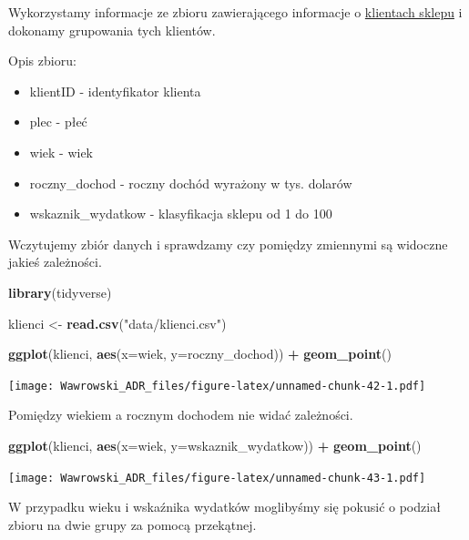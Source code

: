\documentclass[
]{book}
\newenvironment{Shaded}{\begin{snugshade}}{\end{snugshade}}
\newcommand{\DataTypeTok}[1]{\textcolor[rgb]{0.13,0.29,0.53}{#1}}
\newcommand{\KeywordTok}[1]{\textcolor[rgb]{0.13,0.29,0.53}{\textbf{#1}}}
\newcommand{\NormalTok}[1]{#1}
\newcommand{\OperatorTok}[1]{\textcolor[rgb]{0.81,0.36,0.00}{\textbf{#1}}}
\newcommand{\StringTok}[1]{\textcolor[rgb]{0.31,0.60,0.02}{#1}}
\providecommand{\tightlist}{%
  \setlength{\itemsep}{0pt}\setlength{\parskip}{0pt}}
\begin{document}
Wykorzystamy informacje ze zbioru zawierającego informacje o \href{data/klienci.csv}{klientach sklepu} i dokonamy grupowania tych klientów.

Opis zbioru:

\begin{itemize}
\tightlist
\item
  klientID - identyfikator klienta
\item
  plec - płeć
\item
  wiek - wiek
\item
  roczny\_dochod - roczny dochód wyrażony w tys. dolarów
\item
  wskaznik\_wydatkow - klasyfikacja sklepu od 1 do 100
\end{itemize}

Wczytujemy zbiór danych i sprawdzamy czy pomiędzy zmiennymi są widoczne jakieś zależności.

\begin{Shaded}
\begin{Highlighting}[]
\KeywordTok{library}\NormalTok{(tidyverse)}

\NormalTok{klienci <-}\StringTok{ }\KeywordTok{read.csv}\NormalTok{(}\StringTok{"data/klienci.csv"}\NormalTok{)}

\KeywordTok{ggplot}\NormalTok{(klienci, }\KeywordTok{aes}\NormalTok{(}\DataTypeTok{x=}\NormalTok{wiek, }\DataTypeTok{y=}\NormalTok{roczny_dochod)) }\OperatorTok{+}
\StringTok{  }\KeywordTok{geom_point}\NormalTok{()}
\end{Highlighting}
\end{Shaded}

\texttt{[image: Wawrowski\_ADR\_files/figure-latex/unnamed-chunk-42-1.pdf]}

Pomiędzy wiekiem a rocznym dochodem nie widać zależności.

\begin{Shaded}
\begin{Highlighting}[]
\KeywordTok{ggplot}\NormalTok{(klienci, }\KeywordTok{aes}\NormalTok{(}\DataTypeTok{x=}\NormalTok{wiek, }\DataTypeTok{y=}\NormalTok{wskaznik_wydatkow)) }\OperatorTok{+}
\StringTok{  }\KeywordTok{geom_point}\NormalTok{()}
\end{Highlighting}
\end{Shaded}

\texttt{[image: Wawrowski\_ADR\_files/figure-latex/unnamed-chunk-43-1.pdf]}

W przypadku wieku i wskaźnika wydatków moglibyśmy się pokusić o podział zbioru na dwie grupy za pomocą przekątnej.
\end{document}
